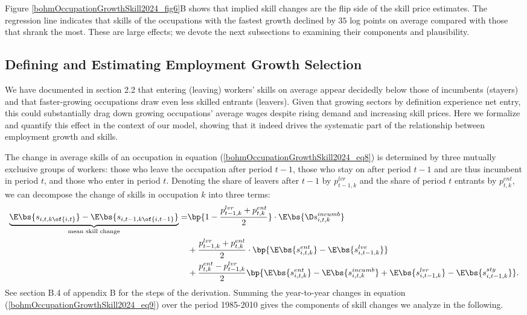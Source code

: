 \documentclass[12pt]{article}
\theoremstyle{definition}
\begin{document}
Figure \ref{bohmOccupationGrowthSkill2024_fig6}B shows that implied skill changes are the flip side of the skill price estimates. The regression line indicates that skills of the occupations with the fastest growth declined by $35$ log points on average compared with those that shrank the most. These are large effects; we devote the next subsections to examining their components and plausibility.

\subsection{Defining and Estimating Employment Growth Selection}

We have documented in section 2.2 that entering (leaving) workers' skills on average appear decidedly below those of incumbents (stayers) and that faster-growing occupations draw even less skilled entrants (leavers). Given that growing sectors by definition experience net entry, this could substantially drag down growing occupations' average wages despite rising demand and increasing skill prices. Here we formalize and quantify this effect in the context of our model, showing that it indeed drives the systematic part of the relationship between employment growth and skills.

The change in average skills of an occupation in equation (\ref{bohmOccupationGrowthSkill2024_eq8}) is determined by three mutually exclusive groups of workers: those who leave the occupation after period $t-1$, those who stay on after period $t-1$ and are thus incumbent in period $t$, and those who enter in period $t$. Denoting the share of leavers after $t-1$ by $p_{t-1, k}^{lvr}$ and the share of period $t$ entrants by $p_{t,k}^{ent}$, we can decompose the change of skills in occupation $k$ into three terms:
\begin{equation}
    \label{bohmOccupationGrowthSkill2024_eq9}
    \begin{aligned}
        \underbrace{\E\bs{s_{i, t, k\of{i,t}}} - \E\bs{s_{i, t-1, k\of{i, t-1}}}}_{\text{mean skill change}} = & \bp{1 - \frac{p_{t-1,k}^{lvr} + p_{t,k}^{ent}}{2}} \cdot \E\bs{\D s_{i, t, k}^{incumb}} \\
        & + \frac{p_{t-1, k}^{lvr} + p_{t, k}^{ent}}{2} \cdot \bp{\E\bs{s_{i, t, k}^{ent}} - \E\bs{s_{i, t-1, k}^{lve}}} \\
        & + \frac{p_{t,k}^{ent} - p_{t-1, k}^{lvr}}{2} \bp{\E\bs{s_{i,t,k}^{ent}} - \E\bs{s_{i,t,k}^{incumb}} + \E\bs{s_{i, t-1, k}^{lvr}} - \E\bs{s_{i, t-1, k}^{sty}}}.
    \end{aligned}
\end{equation}
See section B.4 of appendix B for the steps of the derivation. Summing the year-to-year changes in equation (\ref{bohmOccupationGrowthSkill2024_eq9}) over the period 1985-2010 gives the components of skill changes we analyze in the following.
\end{document}
